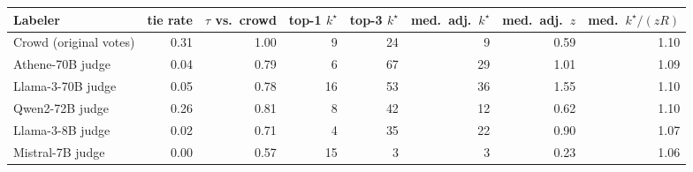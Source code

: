 \begin{tabular}{lrrrrrrr}
\toprule
Labeler & tie rate & $\tau$ vs.\ crowd & top-1 $k^\star$ & top-3 $k^\star$ & med.\ adj.\ $k^\star$ & med.\ adj.\ $z$ & med.\ $k^\star/(zR)$ \\
\midrule
Crowd (original votes) & 0.31 & 1.00 & 9 & 24 & 9 & 0.59 & 1.10 \\
Athene-70B judge & 0.04 & 0.79 & 6 & 67 & 29 & 1.01 & 1.09 \\
Llama-3-70B judge & 0.05 & 0.78 & 16 & 53 & 36 & 1.55 & 1.10 \\
Qwen2-72B judge & 0.26 & 0.81 & 8 & 42 & 12 & 0.62 & 1.10 \\
Llama-3-8B judge & 0.02 & 0.71 & 4 & 35 & 22 & 0.90 & 1.07 \\
Mistral-7B judge & 0.00 & 0.57 & 15 & 3 & 3 & 0.23 & 1.06 \\
\bottomrule
\end{tabular}
